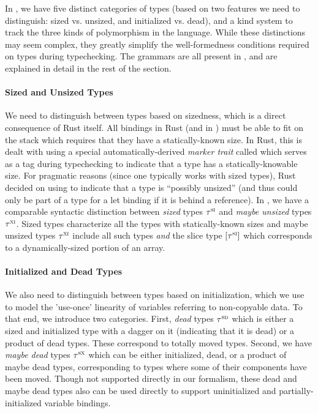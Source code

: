 In \lang, we have five distinct categories of types (based on two features we
need to distinguish: sized vs. unsized, and initialized vs. dead), and a kind
system to track the three kinds of polymorphism in the language. While these
distinctions may seem complex, they greatly simplify the well-formedness
conditions required on types during typechecking. The grammars are all present
in , and are explained in detail in the rest of the
section.

\paragraph{Sized and Unsized Types} We need to distinguish between types based
on sizedness, which is a direct consequence of Rust itself. All bindings in Rust
(and in \lang) must be able to fit on the stack which requires that they have a
statically-known size. In Rust, this is dealt with using a special
automatically-derived \emph{marker trait} called  which serves as a
tag during typechecking to indicate that a type has a statically-knowable size.
For pragmatic reasons (since one typically works with sized types), Rust decided
on using  to indicate that a type is ``possibly unsized'' (and
thus could only be part of a type for a let binding if it is behind a
reference). In \lang, we have a comparable syntactic distinction between
\emph{sized} types $\tau^\textsc{si}$ and \emph{maybe unsized} types $\tau^\textsc{xi}$. Sized
types characterize all the types with statically-known sizes and maybe unsized
types $\tau^\textsc{xi}$ include all such types \emph{and} the slice type
$[\tau^\textsc{si}]$ which corresponds to a dynamically-sized portion of an
array.

\paragraph{Initialized and Dead Types} We also need to distinguish between types
based on initialization, which we use to model the 'use-once' linearity of
variables referring to non-copyable data. To that end, we introduce two
categories. First, \emph{dead} types $\tau^\textsc{sd}$ which is either a sized and
initialized type with a dagger on it (indicating that it is dead) or a product
of dead types. These correspond to totally moved types. Second, we have
\emph{maybe dead} types $\tau^\textsc{sx}$ which can be either initialized, dead, or a
product of maybe dead types, corresponding to types where some of their
components have been moved. Though not supported directly in our formalism,
these dead and maybe dead types also can be used directly to support
uninitialized and partially-initialized variable bindings.

